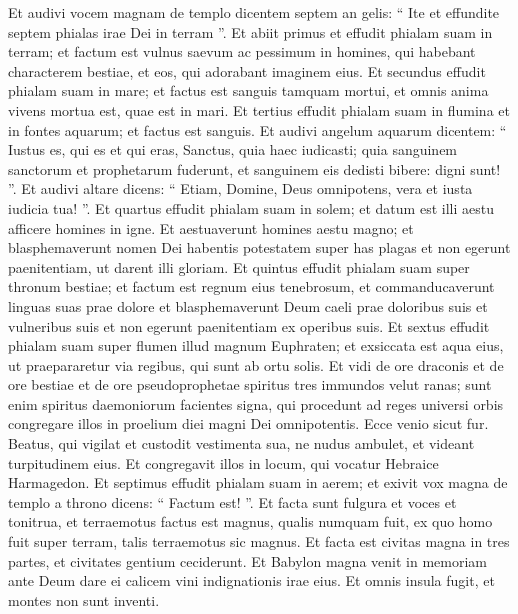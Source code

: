 \begin{biblechapter}
\begin{biblechapter}
\begin{biblechapter}
\begin{biblechapter}
\begin{biblechapter}
\begin{biblechapter}
\begin{biblechapter}
\begin{biblechapter}
\begin{biblechapter}
\begin{biblechapter}
\begin{biblechapter}
\begin{biblechapter}
\begin{biblechapter}
\begin{biblechapter}
\begin{biblechapter}
\begin{biblechapter}
\verse Et audivi vocem magnam de templo dicentem septem an gelis: “ Ite et effundite septem phialas irae Dei in terram ”.
 \verse Et abiit primus et effudit phialam suam in terram; et factum est vulnus saevum ac pessimum in homines, qui habebant characterem bestiae, et eos, qui adorabant imaginem eius.
 \verse Et secundus effudit phialam suam in mare; et factus est sanguis tamquam mortui, et omnis anima vivens mortua est, quae est in mari.
 \verse Et tertius effudit phialam suam in flumina et in fontes aquarum; et factus est sanguis. 
\verse Et audivi angelum aquarum dicentem: “ Iustus es, qui es et qui eras, Sanctus, quia haec iudicasti; 
\verse quia sanguinem sanctorum et prophetarum fuderunt, et sanguinem eis dedisti bibere: digni sunt! ”. 
\verse Et audivi altare dicens: “ Etiam, Domine, Deus omnipotens, vera et iusta iudicia tua! ”.
 \verse Et quartus effudit phialam suam in solem; et datum est illi aestu afficere homines in igne. 
\verse Et aestuaverunt homines aestu magno; et blasphemaverunt nomen Dei habentis potestatem super has plagas et non egerunt paenitentiam, ut darent illi gloriam.
 \verse Et quintus effudit phialam suam super thronum bestiae; et factum est regnum eius tenebrosum, et commanducaverunt linguas suas prae dolore 
\verse et blasphemaverunt Deum caeli prae doloribus suis et vulneribus suis et non egerunt paenitentiam ex operibus suis.
 \verse Et sextus effudit phialam suam super flumen illud magnum Euphraten; et exsiccata est aqua eius, ut praepararetur via regibus, qui sunt ab ortu solis. 
\verse Et vidi de ore draconis et de ore bestiae et de ore pseudoprophetae spiritus tres immundos velut ranas; 
\verse sunt enim spiritus daemoniorum facientes signa, qui procedunt ad reges universi orbis congregare illos in proelium diei magni Dei omnipotentis.
 \verse Ecce venio sicut fur. Beatus, qui vigilat et custodit vestimenta sua, ne nudus ambulet, et videant turpitudinem eius.
 \verse Et congregavit illos in locum, qui vocatur Hebraice Harmagedon.
 \verse Et septimus effudit phialam suam in aerem; et exivit vox magna de templo a throno dicens: “ Factum est! ”. 
\verse Et facta sunt fulgura et voces et tonitrua, et terraemotus factus est magnus, qualis numquam fuit, ex quo homo fuit super terram, talis terraemotus sic magnus. 
\verse Et facta est civitas magna in tres partes, et civitates gentium ceciderunt. Et Babylon magna venit in memoriam ante Deum dare ei calicem vini indignationis irae eius. 
\verse Et omnis insula fugit, et montes non sunt inventi. 

\end{biblechapter}
\end{biblechapter}
\end{biblechapter}
\end{biblechapter}
\end{biblechapter}
\end{biblechapter}
\end{biblechapter}
\end{biblechapter}
\end{biblechapter}
\end{biblechapter}
\end{biblechapter}
\end{biblechapter}
\end{biblechapter}
\end{biblechapter}
\end{biblechapter}
\end{biblechapter}
